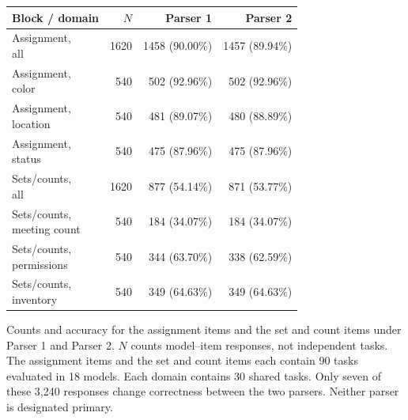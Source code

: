 \begin{minipage}[t]{\columnwidth}
\vspace{0pt}
\centering
\small
\setlength{\tabcolsep}{4pt}
\begin{tabular}{lrrr}
\toprule
Block / domain & $N$ & Parser 1 & Parser 2 \\
\midrule
\shortstack[l]{Assignment,\\all} & 1620 & 1458 (90.00\%) & 1457 (89.94\%) \\
\shortstack[l]{Assignment,\\color} & 540 & 502 (92.96\%) & 502 (92.96\%) \\
\shortstack[l]{Assignment,\\location} & 540 & 481 (89.07\%) & 480 (88.89\%) \\
\shortstack[l]{Assignment,\\status} & 540 & 475 (87.96\%) & 475 (87.96\%) \\
\shortstack[l]{Sets/counts,\\all} & 1620 & 877 (54.14\%) & 871 (53.77\%) \\
\shortstack[l]{Sets/counts,\\meeting count} & 540 & 184 (34.07\%) & 184 (34.07\%) \\
\shortstack[l]{Sets/counts,\\permissions} & 540 & 344 (63.70\%) & 338 (62.59\%) \\
\shortstack[l]{Sets/counts,\\inventory} & 540 & 349 (64.63\%) & 349 (64.63\%) \\
\bottomrule
\end{tabular}
\caption{Counts and accuracy for the assignment items and the set and count items under Parser 1 and Parser 2. $N$ counts model--item responses, not independent tasks. The assignment items and the set and count items each contain 90 tasks evaluated in 18 models. Each domain contains 30 shared tasks. Only seven of these 3,240 responses change correctness between the two parsers. Neither parser is designated primary.}
\label{tab:ef-pooled}
\end{minipage}
